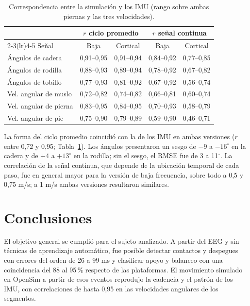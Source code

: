 \documentclass[10pt]{article}
\begin{document}
\begin{table}[H]
\centering
\small
\begin{tabular}{lcccc}
\toprule
 & \multicolumn{2}{c}{$r$ ciclo promedio} & \multicolumn{2}{c}{$r$ señal continua} \\
\cmidrule(lr){2-3}\cmidrule(lr){4-5}
Señal & Baja & Cortical & Baja & Cortical \\
\midrule
Ángulos de cadera       & 0,91--0,95 & 0,91--0,94 & 0,84--0,92 & 0,77--0,85 \\
Ángulos de rodilla      & 0,88--0,93 & 0,89--0,94 & 0,78--0,92 & 0,67--0,82 \\
Ángulos de tobillo      & 0,77--0,93 & 0,81--0,92 & 0,67--0,92 & 0,56--0,74 \\
Vel. angular de muslo   & 0,72--0,82 & 0,74--0,82 & 0,66--0,81 & 0,60--0,74 \\
Vel. angular de pierna  & 0,83--0,95 & 0,84--0,95 & 0,70--0,93 & 0,58--0,79 \\
Vel. angular de pie     & 0,75--0,90 & 0,79--0,89 & 0,59--0,90 & 0,46--0,71 \\
\bottomrule
\end{tabular}
\vspace{1mm}
\caption{Correspondencia entre la simulación y los IMU (rango sobre ambas piernas y las tres velocidades).}
\label{tab:imu}
\end{table}

La forma del ciclo promedio coincidió con la de los IMU en ambas versiones ($r$ entre 0,72 y 0,95; Tabla~\ref{tab:imu}). Los ángulos presentaron un sesgo de $-9$ a $-16^\circ$ en la cadera y de $+4$ a $+13^\circ$ en la rodilla; sin el sesgo, el RMSE fue de 3 a 11$^\circ$. La correlación de la señal continua, que depende de la ubicación temporal de cada paso, fue en general mayor para la versión de baja frecuencia, sobre todo a 0,5 y 0,75 m/s; a 1 m/s ambas versiones resultaron similares.


\section{Conclusiones}

El objetivo general se cumplió para el sujeto analizado. A partir del EEG y sin técnicas de aprendizaje automático, fue posible detectar contactos y despegues con errores del orden de 26 a 99 ms y clasificar apoyo y balanceo con una coincidencia del 88 al 95\,\% respecto de las plataformas. El movimiento simulado en OpenSim a partir de esos eventos reprodujo la cadencia y el patrón de los IMU, con correlaciones de hasta 0,95 en las velocidades angulares de los segmentos.
\end{document}

